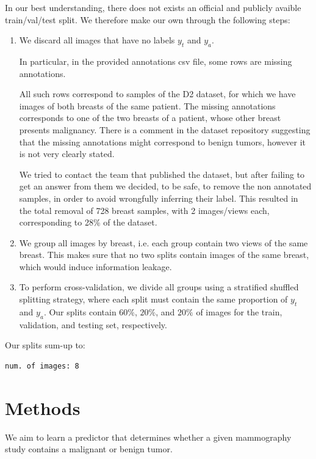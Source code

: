 \documentclass[11pt]{article}
\begin{document}
In our best understanding, there does not exists an official and publicly avaible train/val/test
split. We therefore make our own through the following steps:

\begin{enumerate}
\item We discard all images that have no labels \(y_t\) and \(y_a\).

In particular, in the provided annotations csv file, some rows are missing annotations.

All such rows correspond to samples of the D2 dataset, for which we have images of both
breasts of the same patient.
The missing annotations corresponds to one of the two breasts of a patient, whose other
breast presents malignancy.
There is a comment in the dataset repository suggesting that the missing annotations
might correspond to benign tumors, however it is not very clearly stated.

We tried to contact the team that published the dataset, but after failing to get an answer
from them we decided, to be safe, to remove the non annotated samples, in
order to avoid wrongfully inferring their label. This resulted in the total removal of
728 breast samples, with 2 images/views each, corresponding to  28\% of the dataset.

\item We group all images by breast, i.e. each group contain two views of the same breast.
This makes sure that no two splits contain images of the same breast, which would
induce information leakage.
\item To perform cross-validation, we divide all groups using a stratified
shuffled splitting strategy, where each split
must contain the same proportion of \(y_t\) and \(y_a\). Our splits contain \(60\%\),
 \(20\%\), and \(20\%\) of images for the train, validation, and testing set, respectively.
\end{enumerate}

Our splits sum-up to:
\begin{verbatim}
num. of images: 8
\end{verbatim}

\section{Methods}
\label{sec:org5a1e915}

We aim to learn a predictor that determines whether a given mammography study
contains a malignant or benign tumor.
\end{document}
